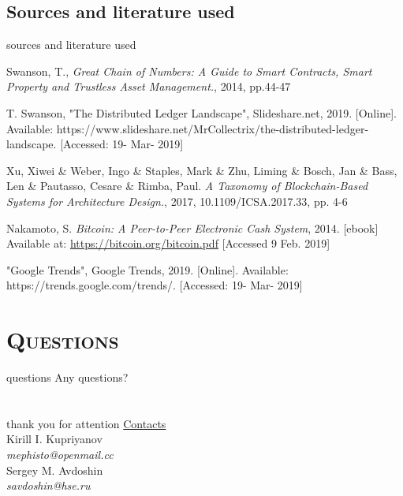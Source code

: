\documentclass[xcolor=x11names,compress]{beamer}
\renewcommand{\(}{\begin{columns}}
\renewcommand{\)}{\end{columns}}
\newcommand{\<}[1]{\begin{column}{#1}}
\renewcommand{\>}{\end{column}}
\begin{document}
\subsection{Sources and literature used}
\begin{frame}{sources and literature used}
\begin{thebibliography}{1}
\tiny
{}
Swanson, T., \emph{Great Chain of Numbers: A Guide to Smart Contracts,
Smart Property and Trustless Asset Management.}, 2014, pp.44-47

T. Swanson, "The Distributed Ledger Landscape", Slideshare.net, 2019. [Online].
        Available:
        https://www.slideshare.net/MrCollectrix/the-distributed-ledger-landscape.
        [Accessed: 19- Mar- 2019]

Xu, Xiwei \& Weber, Ingo \& Staples, Mark \& Zhu, Liming \& Bosch, Jan \& Bass,
Len \& Pautasso, Cesare \& Rimba, Paul. \emph{A Taxonomy of Blockchain-Based Systems for
Architecture Design.}, 2017, 10.1109/ICSA.2017.33, pp. 4-6

Nakamoto, S. \emph{Bitcoin: A Peer-to-Peer Electronic Cash System}, 2014.
[ebook] Available at: \url{https://bitcoin.org/bitcoin.pdf} [Accessed 9 Feb. 2019]

"Google Trends", Google Trends, 2019. [Online]. Available:
        https://trends.google.com/trends/. [Accessed: 19- Mar- 2019]

\end{thebibliography}
\end{frame}


\section{\scshape Questions}
\begin{frame}{questions}
Any questions?
\end{frame}


\section{}
\begin{frame}{thank you for attention}
    \underline{Contacts}\\

    \vspace{0.5cm}
    Kirill I. Kupriyanov\\
    \emph{mephisto@openmail.cc}\\

    \vspace{0.3cm}
    Sergey M. Avdoshin\\
    \emph{savdoshin@hse.ru}
\end{frame}
\end{document}
